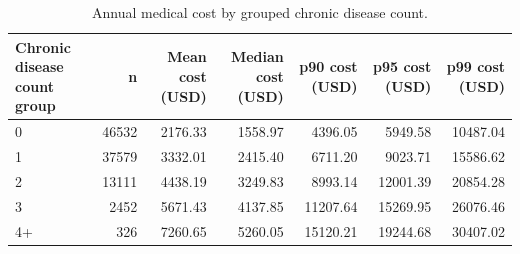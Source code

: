 \begin{table}
\caption{Annual medical cost by grouped chronic disease count.}
\label{tab:01-chronic-count-grouped-summary}
\begin{tabular}{lrrrrrr}
\toprule
Chronic disease count group & n & Mean cost (USD) & Median cost (USD) & p90 cost (USD) & p95 cost (USD) & p99 cost (USD) \\
\midrule
0 & 46532 & 2176.33 & 1558.97 & 4396.05 & 5949.58 & 10487.04 \\
1 & 37579 & 3332.01 & 2415.40 & 6711.20 & 9023.71 & 15586.62 \\
2 & 13111 & 4438.19 & 3249.83 & 8993.14 & 12001.39 & 20854.28 \\
3 & 2452 & 5671.43 & 4137.85 & 11207.64 & 15269.95 & 26076.46 \\
4+ & 326 & 7260.65 & 5260.05 & 15120.21 & 19244.68 & 30407.02 \\
\bottomrule
\end{tabular}
\end{table}
